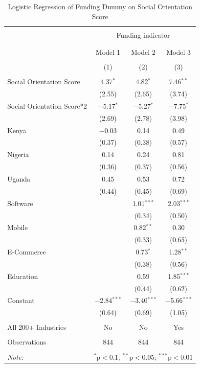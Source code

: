 \documentclass[12pt]{article}
\begin{document}
\begin{table}[!htbp] \centering 
  \caption{Logistic Regression of Funding Dummy on Social Orientation Score} 
  \label{} 
\scriptsize
\begin{tabular}{@{\extracolsep{5pt}}lccc} 
\\[-1.8ex]\hline 
\hline \\[-1.8ex] 
 & \multicolumn{3}{c}{Funding indicator} \\ 
\cline{2-4} 
\\[-1.8ex] & \multicolumn{3}{c}{} \\ 
 & Model 1 & Model 2 & Model 3 \\ 
\\[-1.8ex] & (1) & (2) & (3)\\ 
\hline \\[-1.8ex] 
 Social Orientation Score & 4.37$^{*}$ & 4.82$^{*}$ & 7.46$^{**}$ \\ 
  & (2.55) & (2.65) & (3.74) \\ 
  Social Orientation Score*2 & $-$5.17$^{*}$ & $-$5.27$^{*}$ & $-$7.75$^{*}$ \\ 
  & (2.69) & (2.78) & (3.98) \\ 
  Kenya & $-$0.03 & 0.14 & 0.49 \\ 
  & (0.37) & (0.38) & (0.57) \\ 
  Nigeria & 0.14 & 0.24 & 0.81 \\ 
  & (0.36) & (0.37) & (0.56) \\ 
  Uganda & 0.45 & 0.53 & 0.72 \\ 
  & (0.44) & (0.45) & (0.69) \\ 
  Software &  & 1.01$^{***}$ & 2.03$^{***}$ \\ 
  &  & (0.34) & (0.50) \\ 
  Mobile &  & 0.82$^{**}$ & 0.30 \\ 
  &  & (0.33) & (0.65) \\ 
  E-Commerce &  & 0.73$^{*}$ & 1.28$^{**}$ \\ 
  &  & (0.38) & (0.56) \\ 
  Education &  & 0.59 & 1.85$^{***}$ \\ 
  &  & (0.44) & (0.62) \\ 
  Constant & $-$2.84$^{***}$ & $-$3.40$^{***}$ & $-$5.66$^{***}$ \\ 
  & (0.64) & (0.69) & (1.05) \\ 
 \hline \\[-1.8ex] 
 All 200+ Industries & No & No & Yes  \\ 
 \hline \\[-1.8ex] 
Observations & 844 & 844 & 844 \\ 
\hline 
\hline \\[-1.8ex] 
\textit{Note:}  & \multicolumn{3}{r}{$^{*}$p$<$0.1; $^{**}$p$<$0.05; $^{***}$p$<$0.01} \\ 
\end{tabular} 
\end{table} 
\end{document}
